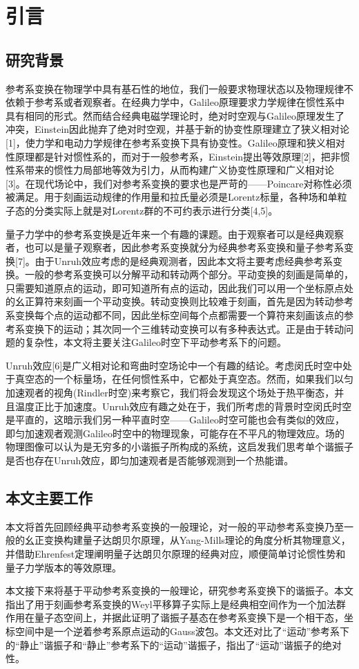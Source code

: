 \documentclass{article}
\begin{document}
    \section{引言}

    \subsection{研究背景}
        参考系变换在物理学中具有基石性的地位，我们一般要求物理状态以及物理规律不依赖于参考系或者观察者。在经典力学中，Galileo原理要求力学规律在惯性系中具有相同的形式。然而结合经典电磁学理论时，绝对时空观与Galileo原理发生了冲突，Einstein因此抛弃了绝对时空观，并基于新的协变性原理建立了狭义相对论[1]，使力学和电动力学规律在参考系变换下具有协变性。Galileo原理和狭义相对性原理都是针对惯性系的，而对于一般参考系，Einstein提出等效原理[2]，把非惯性系带来的惯性力局部地等效为引力，从而构建广义协变性原理和广义相对论[3]。在现代场论中，我们对参考系变换的要求也是严苛的——Poincare对称性必须被满足。用于刻画运动规律的作用量和拉氏量必须是Lorentz标量，各种场和单粒子态的分类实际上就是对Lorentz群的不可约表示进行分类[4,5]。

        量子力学中的参考系变换是近年来一个有趣的课题。由于观察者可以是经典观察者，也可以是量子观察者，因此参考系变换就分为经典参考系变换和量子参考系变换[7]。由于Unruh效应考虑的是经典观测者，因此本文将主要考虑经典参考系变换。一般的参考系变换可以分解平动和转动两个部分。平动变换的刻画是简单的，只需要知道原点的运动，即可知道所有点的运动，因此我们可以用一个坐标原点处的幺正算符来刻画一个平动变换。转动变换则比较难于刻画，首先是因为转动参考系变换每个点的运动都不同，因此坐标空间每个点都需要一个算符来刻画该点的参考系变换下的运动；其次同一个三维转动变换可以有多种表达式。正是由于转动问题的复杂性，本文将主要关注Galileo时空下平动参考系下的问题。

        Unruh效应[6]是广义相对论和弯曲时空场论中一个有趣的结论。考虑闵氏时空中处于真空态的一个标量场，在任何惯性系中，它都处于真空态。然而，如果我们以匀加速观者的视角(Rindler时空)来考察它，我们将会发现这个场处于热平衡态，并且温度正比于加速度。Unruh效应有趣之处在于，我们所考虑的背景时空闵氏时空是平直的，这暗示我们另一种平直时空——Galileo时空可能也会有类似的效应，即匀加速观者观测Galileo时空中的物理现象，可能存在不平凡的物理效应。场的物理图像可以认为是无穷多的小谐振子所构成的系统，这启发我们思考单个谐振子是否也存在Unruh效应，即匀加速观者是否能够观测到一个热能谱。

    \subsection{本文主要工作}

        本文将首先回顾经典平动参考系变换的一般理论，对一般的平动参考系变换乃至一般的幺正变换构建量子达朗贝尔原理，从Yang-Mills理论的角度分析其物理意义，并借助Ehrenfest定理阐明量子达朗贝尔原理的经典对应，顺便简单讨论惯性势和量子力学版本的等效原理。

        本文接下来将基于平动参考系变换的一般理论，研究参考系变换下的谐振子。本文指出了用于刻画参考系变换的Weyl平移算子实际上是经典相空间作为一个加法群作用在量子态空间上，并据此证明了谐振子基态在参考系变换下是一个相干态，坐标空间中是一个逆着参考系原点运动的Gauss波包。本文还对比了“运动”参考系下的“静止”谐振子和“静止”参考系下的“运动”谐振子，指出了“运动”谐振子的绝对性。
\end{document}
